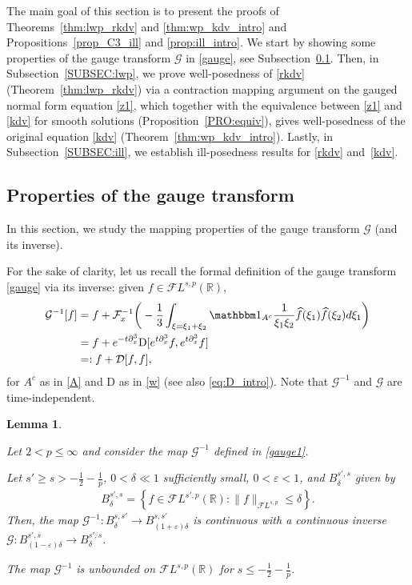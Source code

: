 \documentclass[a4paper,
11pt,  reqno]{amsart}
\newcommand{\5}{\textup{V}}
\newcommand{\noi}{\noindent}
\newcommand{\FL}{\mathcal{F} L}
\newcommand{\ft}{\widehat}
\newcommand{\ind}{\mathbbm 1}
\newcommand{\dl}{\delta}
\newcommand{\eps}{\varepsilon}
\newcommand{\dx}{\partial_x}
\newtheorem{lemma}[theorem]{Lemma}
\theoremstyle{remark}
\newcommand{\R}{\mathbb{R}}
\newcommand{\Ft}{{\mathcal{F}}}
\newcommand{\Gc}{\mathcal{G}}
\numberwithin{equation}{section}
\numberwithin{theorem}{section}
\newcommand{\D}{\mathrm{D}}
\newcommand{\DD}{\mathcal{D}}
\begin{document}
The main goal of this section is to present the proofs of Theorems~\ref{thm:lwp_rkdv} and \ref{thm:wp_kdv_intro} and Propositions~\ref{prop_C3_ill} and \ref{prop:ill_intro}.
We start by showing some properties of the gauge transform $\Gc$ in \eqref{gauge}, see Subsection~\ref{sec:gauge_prop}.
Then, in Subsection~\ref{SUBSEC:lwp}, we prove well-posedness of \eqref{rkdv} (Theorem~\ref{thm:lwp_rkdv}) via a contraction mapping argument on the gauged normal form equation \eqref{z1}, which together with the equivalence between \eqref{z1} and \eqref{kdv} for smooth solutions (Proposition~\ref{PRO:equiv}), gives well-posedness of the original equation \eqref{kdv} (Theorem~\ref{thm:wp_kdv_intro}).
Lastly, in Subsection~\ref{SUBSEC:ill}, we establish ill-posedness results for \eqref{rkdv} and~\eqref{kdv}.




\subsection{Properties of the gauge transform}\label{sec:gauge_prop}
In this section, we study the mapping properties of the gauge transform $\Gc$ (and its inverse).

For the sake of clarity, let us recall the formal definition of the gauge transform \eqref{gauge} via its inverse: given
$f \in \FL^{s,p}(\R)$,
\begin{align}\label{gauge1}
    \Gc^{-1}[f]
    &
    = f + \Ft_x^{-1}\bigg( - \frac{1}{3} \int_{\xi=\xi_1+\xi_2} \ind_{A^c} \frac{1}{\xi_1\xi_2} \ft{f}(\xi_1) \ft{f}(\xi_2) d\xi_1 \bigg)\\&=f + e^{-t\dx^3} \D[e^{t\dx^3} f , e^{t\dx^3}f]
    \\
    &
     =: f + \DD [f, f]
    ,
\end{align}
for $A^c$ as in \eqref{A} and $\D$ as in \eqref{w} (see also \eqref{eq:D_intro}).
Note that $\Gc^{-1}$ and  $\Gc$ are time-independent.



\begin{lemma}\label{LEM:D}

Let $2<p\le \infty$ and consider the map  $\Gc^{-1}$ defined in \eqref{gauge1}.

\smallskip



\noi {\rm(i)}
Let $s' \ge s>-\frac12 - \frac1p$, $0<\dl \ll1$ sufficiently small, $0<\eps<1$, and $B_{\dl}^{s',s}$ given by
\begin{align}
\label{Bss}
B^{s',s}_\delta=\left\{ f\in \FL^{s',p}(\R): \|f\|_{\FL^{s,p}} \le \delta \right\}.
\end{align}
Then, the map $\Gc^{-1}: B^{s, s'}_\dl \to B^{s,s'}_{(1+\eps)\dl}$ is continuous with a continuous inverse $\Gc: B^{s',s}_{(1-\eps)\dl} \to B^{s',s}_\dl$.

\smallskip
\noi {\rm(ii)} The map $\Gc^{-1}$ is unbounded on $\FL^{s,p}(\R)$ for $s\le - \frac12 - \frac1p$.


\end{lemma}
\end{document}
